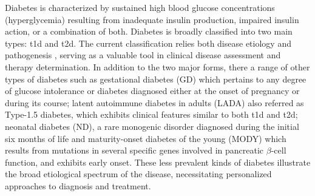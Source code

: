 

Diabetes is characterized by sustained high blood glucose concentrations (hyperglycemia) %
resulting from inadequate insulin production, impaired insulin action, or a combination of both. Diabetes is broadly classified into two main types: \gls{t1d} and \gls{t2d}. The current classification relies both disease etiology and pathogenesis \textbf{\cite{banday_pathophysiology_2020}}, serving as a valuable tool in clinical disease assessment and therapy determination. In addition to the two major forms, there a range of other types of diabetes such as gestational diabetes (GD) which pertains to any degree of glucose intolerance or diabetes diagnosed either at the onset of pregnancy or during its course; latent autoimmune diabetes in adults (LADA) also referred as Type-1.5 diabetes, which exhibits clinical features similar to both \gls{t1d} and \gls{t2d}; neonatal diabetes (ND), a rare monogenic disorder diagnosed during the initial six months of life and maturity-onset diabetes of the young (MODY) which results from mutations in several specific genes involved in pancreatic $\beta$-cell function, and exhibits early onset. These less prevalent kinds of diabetes illustrate the broad etiological spectrum of the disease, necessitating personalized approaches to diagnosis and treatment.





